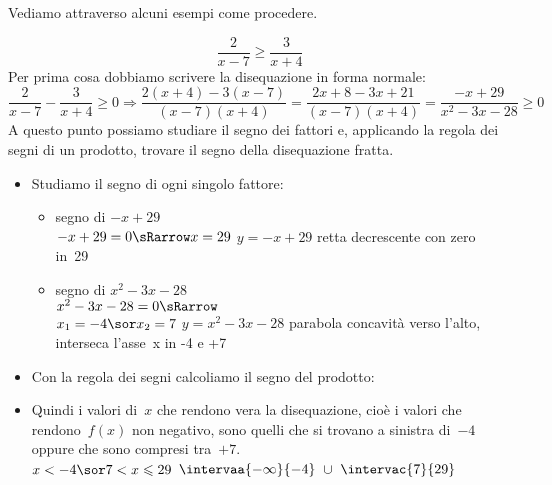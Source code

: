 Vediamo attraverso alcuni esempi come procedere.

\begin{esempio}{}{}
 \[\frac{2}{x-7} \geqslant \frac{3}{x+4}\]
Per prima cosa dobbiamo scrivere la disequazione in forma normale:
 \[\frac{2}{x-7} - \frac{3}{x+4} \geqslant 0 \Rightarrow 
   \frac{2(x+4) - 3(x-7)}{(x-7)(x+4)} = 
   \frac{2 x +8 -3x +21}{(x-7)(x+4)} =
   \frac{-x +29}{x^2-3x-28} \geqslant 0\]
A questo punto possiamo studiare il segno dei fattori e, applicando la regola 
dei segni di un prodotto, trovare il segno della disequazione fratta.

\begin{itemize}
 \item Studiamo il segno di ogni singolo fattore:

\begin{itemize}

 \item  segno di \(-x +29\)\\
 \segnofatt
   {\(-x +29=0 \sRarrow x=29\)}
   {\(y=-x +29\)}
   {retta decrescente con zero in~29}
   {}
 \item segno di \(x^2-3x-28\)\\
 \segnofatt
   {\(x^2-3x-28=0 \sRarrow \) \\
  \(x_1=-4 \sor x_2=7\)}
   {\(y=x^2-3x-28\)}
   {parabola concavità verso l'alto, interseca l'asse~x in -4 e +7}
   {}
\end{itemize}
 \item Con la regola dei segni calcoliamo il segno del prodotto:
\begin{inaccessibleblock}
  \begin{center}
  \segnofrazionea
  \end{center}
\end{inaccessibleblock}
 \item 
 Quindi i valori di~\(x\) che rendono vera la disequazione, cioè 
i valori  che rendono~\(f(x)\) non negativo, sono quelli 
  che si trovano a sinistra di~\(-4\) oppure che sono compresi 
  tra~\(+7\).\\
 \insiemesoluzione
   {\solfrazionea}
   {\(x < -4 \sor 7 < x \leqslant 29\)}
   {\(\intervaa{-\infty}{-4}~\cup~\intervac{7}{29}\)}
\end{itemize}
\end{esempio}

